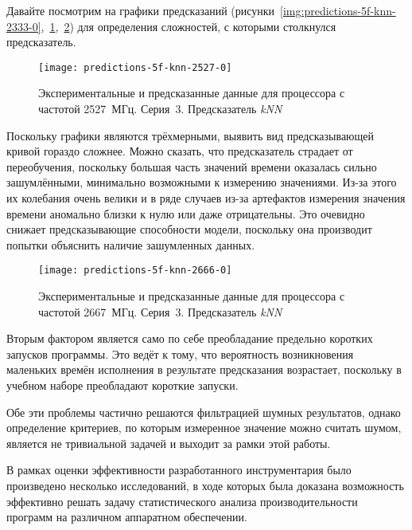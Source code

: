 Давайте посмотрим на графики предсказаний (рисунки~\ref{img:predictions-5f-knn-2333-0},~\ref{img:predictions-5f-knn-2527-0},~\ref{img:predictions-5f-knn-2666-0}) для определения сложностей, с которыми столкнулся предсказатель.

\begin{figure}
    \begin{center}
        \texttt{[image: predictions-5f-knn-2527-0]}
        \caption{Экспериментальные и предсказанные данные для процессора с частотой 2527~МГц. Серия~3. Предсказатель \textit{kNN}}
        \label{img:predictions-5f-knn-2527-0}
    \end{center}
\end{figure}

Поскольку графики являются трёхмерными, выявить вид предсказывающей кривой гораздо сложнее. Можно сказать, что предсказатель страдает от переобучения, поскольку большая часть значений времени оказалась сильно зашумлёнными, минимально возможными к измерению значениями. Из-за этого их колебания очень велики и в ряде случаев из-за артефактов измерения значения времени аномально близки к нулю или даже отрицательны. Это очевидно снижает предсказывающие способности модели, поскольку она производит попытки объяснить наличие зашумленных данных.

\begin{figure}
    \begin{center}
        \texttt{[image: predictions-5f-knn-2666-0]}
        \caption{Экспериментальные и предсказанные данные для процессора с частотой 2667~МГц. Серия~3. Предсказатель \textit{kNN}}
        \label{img:predictions-5f-knn-2666-0}
    \end{center}
\end{figure}

Вторым фактором является само по себе преобладание предельно коротких запусков программы. Это ведёт к тому, что вероятность возникновения маленьких времён исполнения в результате предсказания возрастает, поскольку в учебном наборе преобладают короткие запуски.

Обе эти проблемы частично решаются фильтрацией шумных результатов, однако определение критериев, по которым измеренное значение можно считать шумом, является не тривиальной задачей и выходит за рамки этой работы.

В рамках оценки эффективности разработанного инструментария было произведено несколько исследований, в ходе которых была доказана возможность эффективно решать задачу статистического анализа производительности программ на различном аппаратном обеспечении.